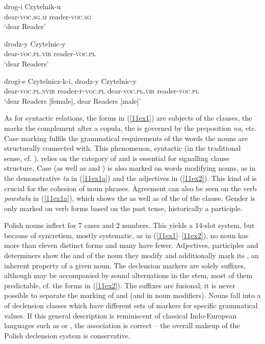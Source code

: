 \documentclass[output=paper,colorlinks,citecolor=brown]{langscibook}
\begin{document}
\begin{exe}
	\ex \label{11ex2}
	\begin{xlist}
		\ex \label{11ex2a}
		\gll drog-i Czytelnik-u \\
		dear-\textsc{voc.sg.m} reader-\textsc{voc.sg} \\
		\trans ‘dear Reader’
		
		\ex \label{11ex2b}
		\gll drodz-y Czytelnic-y \\
		dear-\textsc{voc.pl.vir} reader-\textsc{voc.pl} \\
		\trans ‘dear Readers’
		
		\ex \label{11ex2c}
		\gll drogi-e Czytelnicz-k-i, drodz-y Czytelnic-y \\
		dear-\textsc{voc.pl.nvir} reader-\textsc{f-voc.pl} dear-\textsc{voc.pl.vir} reader-\textsc{voc.pl} \\
		\trans ‘dear Readers [female], dear Readers [male]’
	\end{xlist}
\end{exe}

As for syntactic relations, the  forms in (\ref{11ex1}) are subjects of the clauses, the  marks the  complement after a copula, the  is governed by the preposition \emph{na}, etc. Case marking fulfils the grammatical requirements of the words the nouns are structurally connected with. This phenomenon, syntactic  (in the traditional sense, cf. \citealt[246--250]{matthews1981}), relies on the category of  and is essential for signalling clause structure. Case (as well as  and ) is also marked on words modifying nouns, as in the demonstrative \emph{ta} in (\ref{11ex1a}) and the adjectives in (\ref{11ex2}). This kind of  is crucial for the cohesion of noun phrases. Agreement can also be seen on the verb \emph{powstała} in (\ref{11ex1a}), which shows the  as well as  of the  of the clause. Gender is only marked on verb forms based on the past tense, historically a participle.

Polish nouns inflect for 7 cases and 2 numbers. This yields a 14-slot system, but because of  syncretism, mostly systematic, as in (\ref{11ex1}--\ref{11ex2}), no noun has more than eleven distinct forms and many have fewer. Adjectives, participles and determiners show the  and  of the noun they modify and additionally mark its , an inherent property of a given noun. The declension markers are solely suffixes, although  may be accompanied by sound alternations in the stem, most of them predictable, cf. the forms in (\ref{11ex2}). The suffixes are fusional; it is never possible to separate the marking of  and  (and  in noun modifiers). Nouns fall into a  of declension classes which have different sets of markers for specific grammatical values. If this general description is reminiscent of classical Indo-European languages such as  or , the association is correct -- the overall makeup of the Polish declension system is conservative.
\end{document}
